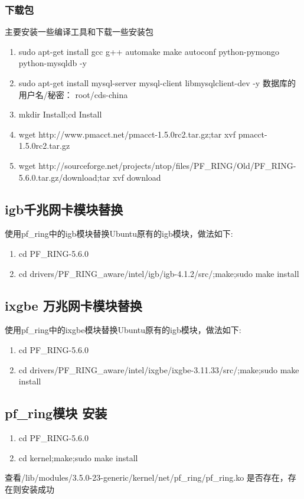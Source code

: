 \documentclass[10pt]{article}
\begin{document}
\subsubsection{下载包}
主要安装一些编译工具和下载一些安装包
\begin{enumerate}
    \item sudo apt-get install gcc g++ automake make autoconf python-pymongo python-mysqldb -y
    \item sudo apt-get install mysql-server mysql-client libmysqlclient-dev -y 数据库的用户名/秘密： root/cds-china
    \item mkdir Install;cd Install
    \item wget http://www.pmacct.net/pmacct-1.5.0rc2.tar.gz;tar xvf pmacct-1.5.0rc2.tar.gz
    \item wget http://sourceforge.net/projects/ntop/files/PF\_RING/Old/PF\_RING-5.6.0.tar.gz/download;tar xvf download
\end{enumerate}

\subsection{igb千兆网卡模块替换}
使用pf\_ring中的igb模块替换Ubuntu原有的igb模块，做法如下:
\begin{enumerate}
    \item cd PF\_RING-5.6.0
    \item cd drivers/PF\_RING\_aware/intel/igb/igb-4.1.2/src/;make;sudo make install
\end{enumerate}
\bigskip
\subsection{ixgbe 万兆网卡模块替换}
	使用pf\_ring中的ixgbe模块替换Ubuntu原有的igb模块，做法如下:
    \begin{enumerate}
		\item cd PF\_RING-5.6.0
		\item cd drivers/PF\_RING\_aware/intel/ixgbe/ixgbe-3.11.33/src/;make;sudo make install
    \end{enumerate}
\bigskip
\subsection{pf\_ring模块 安装}
\begin{enumerate}
	\item cd PF\_RING-5.6.0
	\item cd kernel;make;sudo make install
\end{enumerate}
查看/lib/modules/3.5.0-23-generic/kernel/net/pf\_ring/pf\_ring.ko 是否存在，存在则安装成功
\bigskip
\end{document}
